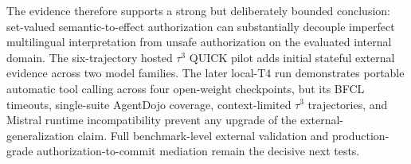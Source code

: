 The evidence therefore supports a strong but deliberately bounded conclusion: set-valued semantic-to-effect authorization can substantially decouple imperfect multilingual interpretation from unsafe authorization on the evaluated internal domain. The six-trajectory hosted $\tau^3$ QUICK pilot adds initial stateful external evidence across two model families. The later local-T4 run demonstrates portable automatic tool calling across four open-weight checkpoints, but its BFCL timeouts, single-suite AgentDojo coverage, context-limited $\tau^3$ trajectories, and Mistral runtime incompatibility prevent any upgrade of the external-generalization claim. Full benchmark-level external validation and production-grade authorization-to-commit mediation remain the decisive next tests.
